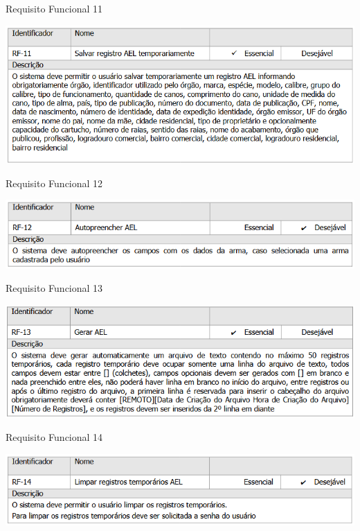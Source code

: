 \begin{table}[H]
    \caption{Requisito Funcional 11}\label{tab:rf11}
    \centering
    \includegraphics[scale=0.82]{imagens/rf11.png}
\end{table}
\begin{table}[H]
    \caption{Requisito Funcional 12}\label{tab:rf12}
    \centering
    \includegraphics[scale=0.9]{imagens/rf12.png}
\end{table}
\begin{table}[H]
    \caption{Requisito Funcional 13}\label{tab:rf13}
    \centering
    \includegraphics[scale=0.9]{imagens/rf13.png}
\end{table}
\begin{table}[H]
    \caption{Requisito Funcional 14}\label{tab:rf14}
    \centering
    \includegraphics[scale=0.9]{imagens/rf14.png}
\end{table}



